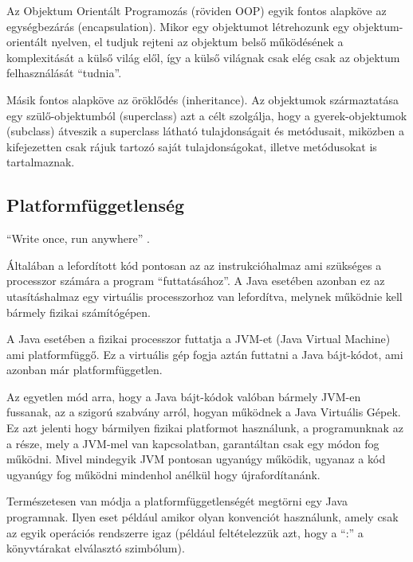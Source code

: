 \documentclass[a4paper,12pt]{report}
\begin{document}
\vspace{2mm}
Az Objektum Orientált Programozás (röviden OOP) egyik fontos alapköve az egységbezárás (encapsulation). Mikor egy objektumot létrehozunk egy objektum-orientált nyelven, el tudjuk rejteni az objektum belső működésének a komplexitását a külső világ elől, így a külső világnak csak elég csak az objektum felhasználását ``tudnia''.

\vspace{2mm}
Másik fontos alapköve az öröklődés (inheritance). Az objektumok származtatása egy szülő-objektumból (superclass) azt a célt szolgálja, hogy a gyerek-objektumok (subclass) átveszik a superclass látható tulajdonságait és metódusait, miközben a kifejezetten csak rájuk tartozó saját tulajdonságokat, illetve metódusokat is tartalmaznak.

\subsection{Platformfüggetlenség}
\label{platformfugg}

``Write once, run anywhere'' \cite{wora}.

\vspace{2mm}
Általában a lefordított kód pontosan az az instrukcióhalmaz ami szükséges a processzor számára a program ``futtatásához''. A Java esetében azonban ez az utasításhalmaz egy virtuális processzorhoz van lefordítva, melynek működnie kell bármely fizikai számítógépen.

\vspace{2mm}
A Java esetében a fizikai processzor futtatja a JVM-et (Java Virtual Machine) ami platformfüggő. Ez a virtuális gép fogja aztán futtatni a Java bájt-kódot, ami azonban már platformfüggetlen. 

\vspace{2mm}
Az egyetlen mód arra, hogy a Java bájt-kódok valóban bármely JVM-en fussanak, az a szigorú szabvány arról, hogyan működnek a Java Virtuális Gépek. Ez azt jelenti hogy bármilyen fizikai platformot használunk, a programunknak az a része, mely a JVM-mel van kapcsolatban, garantáltan csak egy módon fog működni. Mivel mindegyik JVM pontosan ugyanúgy működik, ugyanaz a kód ugyanúgy fog működni mindenhol anélkül hogy újrafordítanánk.

\vspace{2mm}
Természetesen van módja a platformfüggetlenségét megtörni egy Java programnak. Ilyen eset például amikor olyan konvenciót használunk, amely csak az egyik operációs rendszerre igaz (például feltételezzük azt, hogy a ``:'' a könyvtárakat elválasztó szimbólum).
\end{document}
